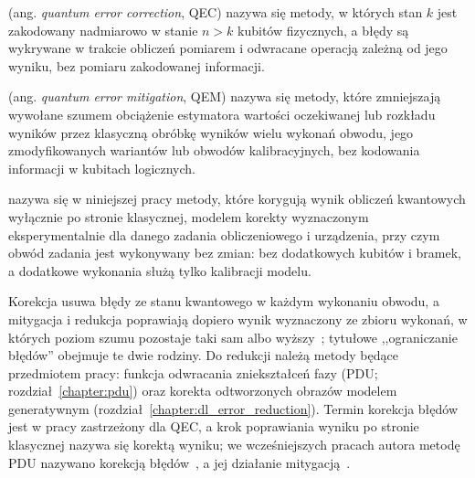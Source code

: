 \begin{Definition}\label{def:tb03:qec}
 (ang. \emph{quantum error correction}, QEC) nazywa się metody, w których stan $k$  jest zakodowany nadmiarowo w stanie $n>k$ kubitów fizycznych, a błędy są wykrywane w trakcie obliczeń pomiarem  i odwracane operacją zależną od jego wyniku, bez pomiaru zakodowanej informacji.
\end{Definition}

\begin{Definition}\label{def:tb03:qem}
 (ang. \emph{quantum error mitigation}, QEM) nazywa się metody, które zmniejszają wywołane szumem obciążenie estymatora wartości oczekiwanej lub rozkładu wyników przez klasyczną obróbkę wyników wielu wykonań obwodu, jego zmodyfikowanych wariantów lub obwodów kalibracyjnych, bez kodowania informacji w kubitach logicznych.
\end{Definition}

\begin{Definition}\label{def:tb03:reduction}
 nazywa się w niniejszej pracy metody, które korygują wynik obliczeń kwantowych wyłącznie po stronie klasycznej, modelem korekty wyznaczonym eksperymentalnie dla danego zadania obliczeniowego i urządzenia, przy czym obwód zadania jest wykonywany bez zmian: bez dodatkowych kubitów i bramek, a dodatkowe wykonania służą tylko kalibracji modelu.
\end{Definition}

Korekcja usuwa błędy ze stanu kwantowego w każdym wykonaniu obwodu, a mitygacja i redukcja poprawiają dopiero wynik wyznaczony ze zbioru wykonań, w których poziom szumu pozostaje taki sam albo wyższy~\cite{cai2023quantum}; tytułowe ,,ograniczanie błędów'' obejmuje te dwie rodziny.
Do redukcji należą metody będące przedmiotem pracy: funkcja odwracania zniekształceń fazy (PDU; rozdział~\ref{chapter:pdu}) oraz korekta odtworzonych obrazów modelem generatywnym (rozdział~\ref{chapter:dl_error_reduction}).
Termin korekcja błędów jest w pracy zastrzeżony dla QEC, a krok poprawiania wyniku po stronie klasycznej nazywa się korektą wyniku; we wcześniejszych pracach autora metodę PDU nazywano korekcją błędów~\cite{werner_experiment_driven_2022}, a jej działanie mitygacją~\cite{werner_magisterka_2022}.

